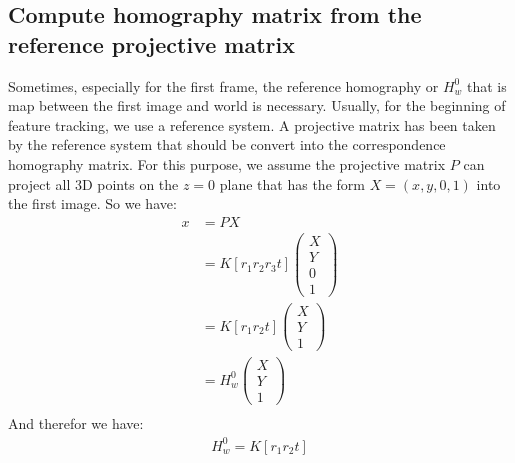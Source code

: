 \subsection{Compute homography matrix from the reference projective matrix}
Sometimes, especially for the first frame, the reference homography or $H_{w}^{0}$ that is map between the first image and world is necessary. Usually, for the beginning of feature tracking, we use a reference system. A projective matrix has been taken by the reference system that should be convert into the correspondence homography matrix. For this purpose, we assume the projective matrix $P$ can project all 3D points on the $z=0$ plane that has the form $X=(x,y,0,1)$ into the first image. So we have:
\begin{align*} 
x  &=  P X \\
   &=  K [r_{1}r_{2}r_{3}t] 
 \begin{pmatrix}
  X \\
  Y \\
  0 \\
  1
 \end{pmatrix} \\
  &=  K [r_{1}r_{2}t] \begin{pmatrix}
  X \\
  Y \\
  1
 \end{pmatrix} \\
  &=  H_{w}^{0} \begin{pmatrix}
  X \\
  Y \\
  1
 \end{pmatrix} \\
\end{align*}
And therefor we have:
\begin{gather*}
	H_{w}^{0} = K [r_{1}r_{2}t]
\end{gather*}\label{eq:homography_to_projective}

